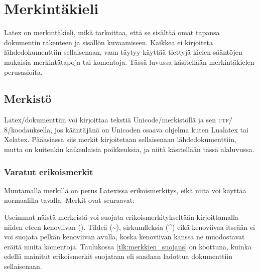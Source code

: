 
\chapter{Merkintäkieli}

Latex on merkintäkieli, mikä tarkoittaa, että se sisältää omat tapansa
dokumentin rakenteen ja sisällön kuvaamiseen. Kaikkea ei kirjoiteta
lähdedokumenttiin sellaisenaan, vaan täytyy käyttää tiettyjä kielen
sääntöjen mukaisia merkintätapoja tai komentoja. Tässä luvussa
käsitellään merkintäkielen perusasioita.

\section{Merkistö}

Latex\-/dokumenttiin voi kirjoittaa tekstiä Unicode\-/merkistöllä ja sen
\textsc{utf}\=/8\-/koodauksella, jos kääntäjänä on Unicoden osaava
ohjelma kuten Lualatex tai Xelatex. Pääasiassa siis merkit kirjoitetaan
sellaisenaan lähdedokumenttiin, mutta on kuitenkin kaikenlaisia
poikkeuksia, ja niitä käsitellään tässä alaluvussa.

\subsection{Varatut erikoismerkit}

Muutamalla merkillä on perus Latexissa erikoismerkitys, eikä niitä voi
käyttää normaalilla tavalla. Merkit ovat seuraavat:

\begin{koodilohkosis}
\end{koodilohkosis}

Useimmat näistä merkeistä voi suojata erikoismerkitykseltään
kirjoittamalla niiden eteen kenoviivan (\koodi{\keno}). Tildeä
(\textasciitilde), sirkumfleksia (\textasciicircum) eikä kenoviivaa
itseään ei voi suojata pelkän kenoviivan avulla, koska kenoviivan kanssa
ne muodostavat eräitä muita komentoja. Taulukossa
\ref{tlk:merkkien_suojaus} on koottuna, kuinka edellä mainitut
erikoismerkit suojataan eli saadaan ladottua dokumenttiin sellaisenaan.

